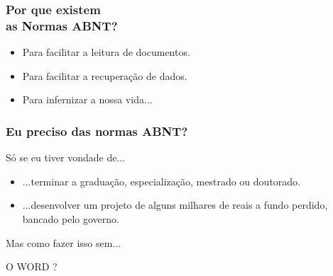 \documentclass[aspect=43,14pt]{beamer}
\begin{document}
\begin{frame}
    \frametitle{Por que existem \\ as Normas ABNT?}
    \begin{itemize}
        \item{Para facilitar a leitura de documentos.}
        \item{Para facilitar a recuperação de dados.}
        \item{Para infernizar a nossa vida...}
    \end{itemize}
\end{frame}

\begin{frame}
    \frametitle{Eu preciso das normas ABNT?}
    Só se eu tiver vondade de...
    \begin{itemize}
        \item{...terminar a graduação, especialização, mestrado ou doutorado.}
        \item{...desenvolver um projeto de alguns milhares de reais a fundo perdido, bancado pelo governo.}
    \end{itemize}
    Mas como fazer isso sem...
\end{frame}

\begin{frame}
\begin{center}
\Huge O WORD ?
\end{center}
\end{frame}
\end{document}
